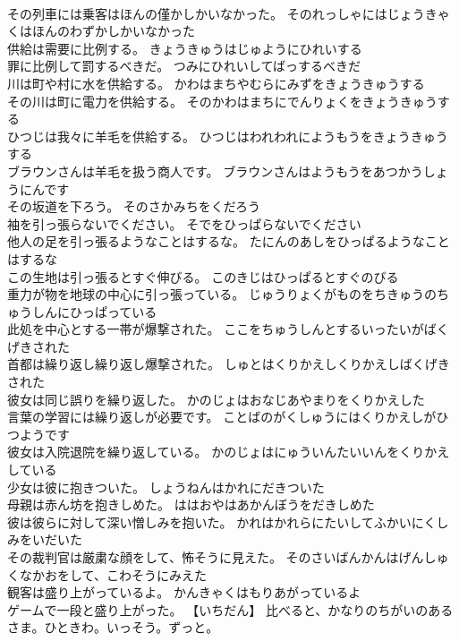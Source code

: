 \documentclass[8pt]{extreport}
\begin{document}
\begin{CJK}{UTF8}{min}
\\	その列車には乗客はほんの僅かしかいなかった。	そのれっしゃにはじょうきゃくはほんのわずかしかいなかった 
\\	供給は需要に比例する。	きょうきゅうはじゅようにひれいする 
\\	罪に比例して罰するべきだ。	つみにひれいしてばっするべきだ 
\\	川は町や村に水を供給する。	かわはまちやむらにみずをきょうきゅうする 
\\	その川は町に電力を供給する。	そのかわはまちにでんりょくをきょうきゅうする 
\\	ひつじは我々に羊毛を供給する。	ひつじはわれわれにようもうをきょうきゅうする 
\\	ブラウンさんは羊毛を扱う商人です。	ブラウンさんはようもうをあつかうしょうにんです 
\\	その坂道を下ろう。	そのさかみちをくだろう 
\\	袖を引っ張らないでください。	そでをひっぱらないでください 
\\	他人の足を引っ張るようなことはするな。	たにんのあしをひっぱるようなことはするな 
\\	この生地は引っ張るとすぐ伸びる。	このきじはひっぱるとすぐのびる 
\\	重力が物を地球の中心に引っ張っている。	じゅうりょくがものをちきゅうのちゅうしんにひっぱっている 
\\	此処を中心とする一帯が爆撃された。	ここをちゅうしんとするいったいがばくげきされた 
\\	首都は繰り返し繰り返し爆撃された。	しゅとはくりかえしくりかえしばくげきされた 
\\	彼女は同じ誤りを繰り返した。	かのじょはおなじあやまりをくりかえした 
\\	言葉の学習には繰り返しが必要です。	ことばのがくしゅうにはくりかえしがひつようです 
\\	彼女は入院退院を繰り返している。	かのじょはにゅういんたいいんをくりかえしている 
\\	少女は彼に抱きついた。	しょうねんはかれにだきついた 
\\	母親は赤ん坊を抱きしめた。	ははおやはあかんぼうをだきしめた 
\\	彼は彼らに対して深い憎しみを抱いた。	かれはかれらにたいしてふかいにくしみをいだいた 
\\	その裁判官は厳粛な顔をして、怖そうに見えた。	そのさいばんかんはげんしゅくなかおをして、こわそうにみえた 
\\	観客は盛り上がっているよ。	かんきゃくはもりあがっているよ 
\\	ゲームで一段と盛り上がった。	【いちだん】 比べると、かなりのちがいのあるさま。ひときわ。いっそう。ずっと。

\end{CJK}
\end{document}
